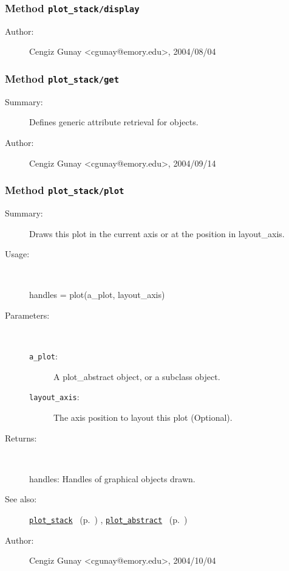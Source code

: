 \subsubsection[Method \texttt{display}]{Method \texttt{plot\_stack/display}}%
%
\label{ref_plot_stack__display}%
\hypertarget{ref_plot_stack__display}{}%
\begin{description}
%
%
%
%
%
%
%
\item[Author:]%
Cengiz Gunay <cgunay@emory.edu>, 2004/08/04
%
\end{description}
\methodline%
\subsubsection[Method \texttt{get}]{Method \texttt{plot\_stack/get}}%
%
\label{ref_plot_stack__get}%
\hypertarget{ref_plot_stack__get}{}%
\begin{description}
\item[Summary:]Defines generic attribute retrieval for objects.
%
%
%
%
%
%
%
\item[Author:]%
Cengiz Gunay <cgunay@emory.edu>, 2004/09/14
%
\end{description}
\methodline%
\subsubsection[Method \texttt{plot}]{Method \texttt{plot\_stack/plot}}%
%
\label{ref_plot_stack__plot}%
\hypertarget{ref_plot_stack__plot}{}%
\begin{description}
\item[Summary:]Draws this plot in the current axis or at the position in
	layout\_axis.
%
\item[Usage:]~%
\begin{lyxcode}%
handles = plot(a\_plot, layout\_axis)
%
\end{lyxcode}%
%
%
\item[Parameters:]~
\begin{description}%
\item[\texttt{a\_plot}:]
 A plot\_abstract object, or a subclass object.
\item[\texttt{layout\_axis}:]
 The axis position to layout this plot (Optional). 
\end{description}%
%
\item[Returns:
]~

	handles: Handles of graphical objects drawn.
%
%
\item[See also:]%
\hyperlink{ref_plot_stack}{\texttt{plot\_stack}}%
\ (p.~\pageref{ref_plot_stack})%
%
, \hyperlink{ref_plot_abstract}{\texttt{plot\_abstract}}%
\ (p.~\pageref{ref_plot_abstract})%
%
%
\item[Author:]%
Cengiz Gunay <cgunay@emory.edu>, 2004/10/04
%
\end{description}
\methodline%
